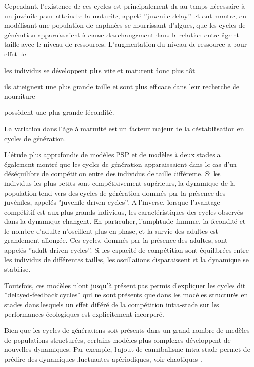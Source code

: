 Cependant, l'existence de ces cycles est principalement du au temps nécessaire à
un juvénile pour atteindre la maturité, appelé ''juvenile delay''.
\textcite{de-roos1990a} et \textcite{de-roos1997a} ont montré, en modélisant
une population de daphnées se nourrissant d'algues, que les cycles de génération apparaissaient à
cause des changement dans la relation entre âge et taille avec le niveau de
ressources. L'augmentation du niveau de ressource a pour effet de
\begin{enumerate*}[label=(\roman*), before=\unskip{ : }, itemjoin={{ ; }},
itemjoin*={{ ; et }}]\item les individus se développent plus vite et maturent
donc plus tôt \item ils atteignent une plus grande taille et sont plus efficace
dans leur recherche de nourriture \item possèdent une plus grande
fécondité.\end{enumerate*} La variation dans l'âge à maturité est un facteur
majeur de la déstabilisation en cycles de génération.

\label{competPopStru}L'étude plus approfondie de modèles PSP et de modèles à
deux stades \autocite[juvéniles et adultes, ][]{de-roos2003a} a également montré que les
cycles de génération apparaissaient dans le cas d'un déséquilibre de compétition
entre des individus de taille différente. Si les individus les plus petits sont
compétitivement supérieurs, la dynamique de la population tend vers des cycles
de génération dominés par la présence des juvéniles, appelés ''juvenile driven
cycles''. A l'inverse, lorsque l'avantage compétitif est aux plus grands
individus, les caractéristiques des cycles observés dans la dynamique changent.
En particulier, l'amplitude diminue, la fécondité et le nombre d'adulte
n'oscillent plus en phase, et la survie des adultes est grandement allongée. Ces
cycles, dominés par la présence des adultes, sont appelés ''adult driven cycles''.
Si les capacité de compétition sont équilibrées entre les individus de
différentes tailles, les oscillations disparaissent et la dynamique se
stabilise. 

Toutefois, ces modèles n'ont jusqu'à présent pas permis d'expliquer
les cycles dit ''delayed-feedback cycles'' qui ne sont présents que dans les
modèles structurés en stades dans lesquels un effet différé de la compétition
intra-stade sur les performances écologiques est explicitement incorporé.

Bien que les cycles de générations soit présents dans un grand nombre de modèles
de populations structurées, certains modèles plus complexes développent de
nouvelles dynamiques. Par exemple, l'ajout de cannibalisme intra-stade permet de
prédire des dynamiques fluctuantes apériodiques, voir chaotiques
\autocite{costantino1997a,dennis1997a}.

